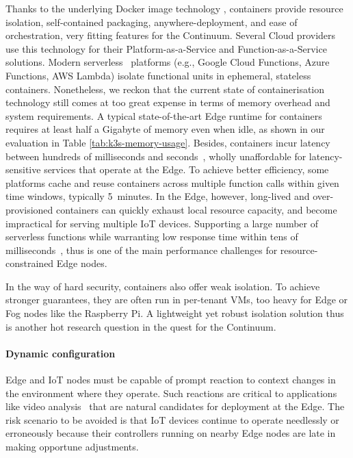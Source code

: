 Thanks to the underlying Docker image technology \cite{docker-image}, containers provide resource isolation, self-contained packaging, anywhere-deployment, and ease of orchestration, very fitting features for the Continuum.
Several Cloud providers use this technology for their Platform-as-a-Service and Function-as-a-Service solutions. Modern serverless~\cite{jonas2019Cloud} platforms (e.g., Google Cloud Functions, Azure Functions, AWS Lambda) isolate functional units in ephemeral, stateless containers. 
Nonetheless, we reckon that the current state of containerisation technology still comes at too great expense in terms of memory overhead and system requirements. A typical state-of-the-art Edge runtime for containers requires at least half a Gigabyte of memory even when idle, as shown in our evaluation in Table \ref{tab:k3s-memory-usage}.
Besides, containers incur latency between hundreds of milliseconds and seconds~\cite{mohanty2018evaluation}, wholly unaffordable for latency-sensitive services that operate at the Edge. 
To achieve better efficiency, some platforms cache and reuse containers across multiple function calls within given time windows, typically 5~minutes. 
In the Edge, however, long-lived and over-provisioned containers can quickly exhaust local resource capacity, and become impractical for serving multiple IoT devices. 
Supporting a large number of serverless functions while warranting low response time within tens of milliseconds~\cite{elbamby2019wireless}, thus is one of the main performance challenges for resource-constrained Edge nodes.

In the way of hard security, containers also offer weak isolation. To achieve stronger guarantees, they are often run in per-tenant VMs, too heavy for Edge or Fog nodes like the Raspberry Pi. 
A light\-weight yet robust isolation solution thus is another hot research question in the quest for the Continuum.

\paragraph{Dynamic configuration}

Edge and IoT nodes must be capable of prompt reaction to context changes in the environment where they operate. 
Such reactions are critical to applications like video analysis~\cite{jang2018application} that are natural candidates for deployment at the Edge. 
The risk scenario to be avoided is that IoT devices continue to operate needlessly or erroneously because their controllers running on nearby Edge nodes are late in making opportune adjustments.

